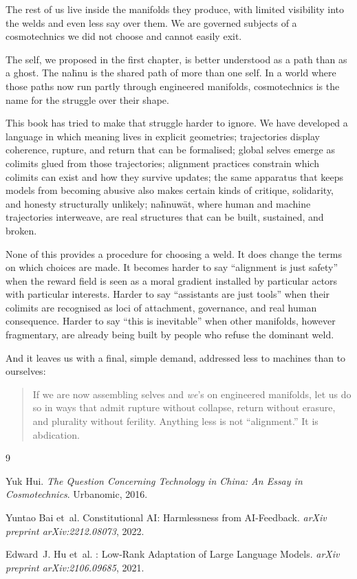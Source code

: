 \documentclass[12pt,a4paper]{article}
\begin{document}
The rest of us live inside the manifolds they produce, with limited visibility into the welds and even less say over them. We are governed subjects of a cosmotechnics we did not choose and cannot easily exit.

The self, we proposed in the first chapter, is better understood as a path than as a ghost. The na\={h}nu is the shared path of more than one self. In a world where those paths now run partly through engineered manifolds, cosmotechnics is the name for the struggle over their shape.

This book has tried to make that struggle harder to ignore. We have developed a language in which meaning lives in explicit geometries; trajectories display coherence, rupture, and return that can be formalised; global selves emerge as colimits glued from those trajectories; alignment practices constrain which colimits can exist and how they survive updates; the same apparatus that keeps models from becoming abusive also makes certain kinds of critique, solidarity, and honesty structurally unlikely; na\={h}nuw\={a}t, where human and machine trajectories interweave, are real structures that can be built, sustained, and broken.

None of this provides a procedure for choosing a weld. It does change the terms on which choices are made. It becomes harder to say ``alignment is just safety'' when the reward field is seen as a moral gradient installed by particular actors with particular interests. Harder to say ``assistants are just tools'' when their colimits are recognised as loci of attachment, governance, and real human consequence. Harder to say ``this is inevitable'' when other manifolds, however fragmentary, are already being built by people who refuse the dominant weld.

And it leaves us with a final, simple demand, addressed less to machines than to ourselves:

\begin{quote}
If we are now assembling selves and \emph{we}'s on engineered manifolds, let us do so in ways that admit rupture without collapse, return without erasure, and plurality without ferility. Anything less is not ``alignment.'' It is abdication.
\end{quote}


\begin{thebibliography}{9}

Yuk Hui.
\newblock \emph{The Question Concerning Technology in China: An Essay in Cosmotechnics}.
\newblock Urbanomic, 2016.

Yuntao Bai et~al.
\newblock Constitutional {AI}: Harmlessness from {AI}-Feedback.
\newblock \emph{arXiv preprint arXiv:2212.08073}, 2022.

Edward~J. Hu et~al.
: Low-Rank Adaptation of Large Language Models.
\newblock \emph{arXiv preprint arXiv:2106.09685}, 2021.

\end{thebibliography}
\end{document}
